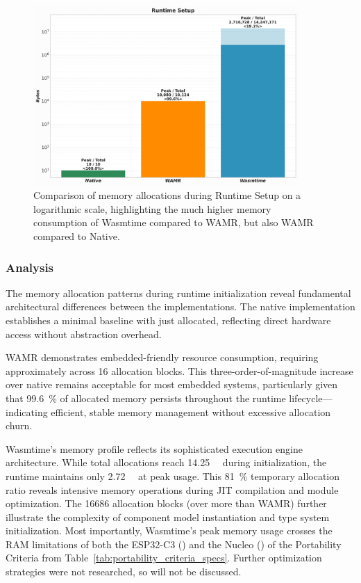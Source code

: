 \begin{figure}[H]
    \centering
    \includegraphics[width=0.9\textwidth]{images/mem_runtime.png}
    \caption{Comparison of memory allocations during Runtime Setup on a logarithmic scale, highlighting the much higher memory consumption of Wasmtime compared to WAMR, but also WAMR compared to Native.}
    \label{fig:mem_runtime}
\end{figure}

\subsubsection{Analysis}

The memory allocation patterns during runtime initialization reveal fundamental architectural differences between the implementations. The native implementation establishes a minimal baseline with just  allocated, reflecting direct hardware access without abstraction overhead.

WAMR demonstrates embedded-friendly resource consumption, requiring approximately  across 16 allocation blocks. This three-order-of-magnitude increase over native remains acceptable for most embedded systems, particularly given that \SI[round-precision=1]{99.6}{\percent} of allocated memory persists throughout the runtime lifecycle—indicating efficient, stable memory management without excessive allocation churn.

Wasmtime's memory profile reflects its sophisticated execution engine architecture. While total allocations reach \SI{14.25}{\mega\byte} during initialization, the runtime maintains only \SI{2.72}{\mega\byte} at peak usage. This \SI[round-precision=1]{81}{\percent} temporary allocation ratio reveals intensive memory operations during JIT compilation and module optimization. The \num[round-precision=0]{16686} allocation blocks (over  more than WAMR) further illustrate the complexity of component model instantiation and type system initialization. Most importantly, Wasmtime's peak memory usage crosses the RAM limitations of both the ESP32-C3 () and the Nucleo () of the Portability Criteria from Table~\ref{tab:portability_criteria_specs}. Further optimization strategies were not researched, so will not be discussed.

